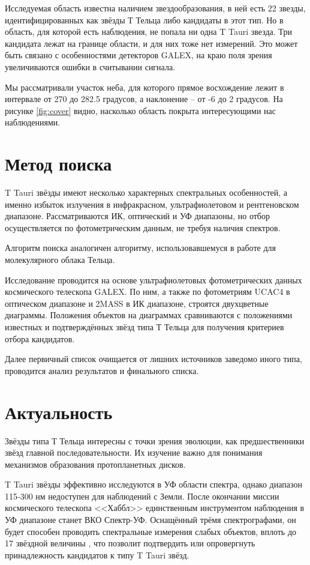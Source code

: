 Исследуемая область известна наличием звездообразования, в ней есть 22 звезды, идентифицированных как звёзды Т Тельца либо кандидаты в этот тип. Но в область, для которой есть наблюдения, не попала ни одна T Tauri звезда. Три кандидата лежат на границе области, и для них тоже нет измерений. Это может быть связано с особенностями детекторов GALEX, на краю поля зрения увеличиваются ошибки в считывании сигнала.

Мы рассматривали участок неба, для которого прямое восхождение лежит в интервале от 270 до 282.5 градусов, а наклонение -- от -6 до 2 градусов. На рисунке \ref{fig:cover} видно, насколько область покрыта интересующими нас наблюдениями.

\section{Метод поиска}
T Tauri звёзды имеют несколько характерных спектральных особенностей, а именно избыток излучения в инфракрасном, ультрафиолетовом и рентгеновском диапазоне. Рассматриваются ИК, оптический и УФ диапазоны, но отбор осуществляется по фотометрическим данным, не требуя наличия спектров.

Алгоритм поиска аналогичен алгоритму, использовавшемуся в работе \cite{AIGdC2014galex} для молекулярного облака Тельца.

Исследование проводится на основе ультрафиолетовых фотометрических данных космического телескопа GALEX. По ним, а также по фотометриям UCAC4 в оптическом диапазоне и 2MASS в ИК диапазоне, строятся двухцветные диаграммы. Положения объектов на диаграммах сравниваются с положениями известных и подтверждённых звёзд типа Т Тельца для получения критериев отбора кандидатов.

Далее первичный список очищается от лишних источников заведомо иного типа, проводится анализ результатов и финального списка.

\section{Актуальность}
Звёзды типа Т Тельца интересны с точки зрения эволюции, как предшественники звёзд главной последовательности. Их изучение важно для понимания механизмов образования протопланетных дисков.


T Tauri звёзды эффективно исследуются в УФ области спектра, однако диапазон 115-300 нм недоступен для наблюдений с Земли.
После окончании миссии космического телескопа <<Хаббл>> единственным инструментом наблюдения в УФ диапазоне станет ВКО Спектр-УФ. Оснащённый трёмя спектрографами, он будет способен проводить спектральные измерения слабых объектов, вплоть до 17 звёздной величины \cite{malkov2011scientific}, что позволит подтвердить или опровергнуть принадлежность кандидатов к типу T Tauri звёзд.

